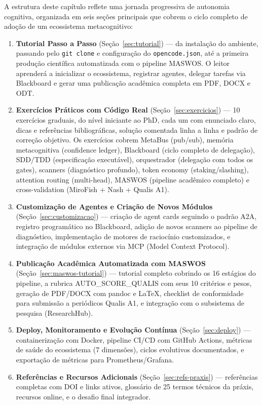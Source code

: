 A estrutura deste capítulo reflete uma jornada progressiva de autonomia cognitiva, organizada em seis seções principais que cobrem o ciclo completo de adoção de um ecossistema metacognitivo:

\begin{enumerate}[leftmargin=*, label=(\arabic*)]
  \item \textbf{Tutorial Passo a Passo} (Seção~\ref{sec:tutorial}) — da instalação do ambiente, passando pelo \texttt{git clone} e configuração do \texttt{opencode.json}, até a primeira produção científica automatizada com o pipeline MASWOS. O leitor aprenderá a inicializar o ecossistema, registrar agentes, delegar tarefas via Blackboard e gerar uma publicação acadêmica completa em PDF, DOCX e ODT.
  \item \textbf{Exercícios Práticos com Código Real} (Seção~\ref{sec:exercicios}) — 10 exercícios graduais, do nível iniciante ao PhD, cada um com enunciado claro, dicas e referências bibliográficas, solução comentada linha a linha e padrão de correção objetivo. Os exercícios cobrem MetaBus (pub/sub), memória metacognitiva (confidence ledger), Blackboard (ciclo completo de delegação), SDD/TDD (especificação executável), orquestrador (delegação com todos os gates), scanners (diagnóstico profundo), token economy (staking/slashing), attention routing (multi-head), MASWOS (pipeline acadêmico completo) e cross-validation (MiroFish + Nash + Qualis A1).
  \item \textbf{Customização de Agentes e Criação de Novos Módulos} (Seção~\ref{sec:customizacao}) — criação de agent cards seguindo o padrão A2A, registro programático no Blackboard, adição de novos scanners ao pipeline de diagnóstico, implementação de motores de raciocínio customizados, e integração de módulos externos via MCP (Model Context Protocol).
  \item \textbf{Publicação Acadêmica Automatizada com MASWOS} (Seção~\ref{sec:maswos-tutorial}) — tutorial completo cobrindo os 16 estágios do pipeline, a rubrica AUTO\_SCORE\_QUALIS com seus 10 critérios e pesos, geração de PDF/DOCX com pandoc e LaTeX, checklist de conformidade para submissão a periódicos Qualis A1, e integração com o subsistema de pesquisa (ResearchHub).
  \item \textbf{Deploy, Monitoramento e Evolução Contínua} (Seção~\ref{sec:deploy}) — containerização com Docker, pipeline CI/CD com GitHub Actions, métricas de saúde do ecossistema (7 dimensões), ciclos evolutivos documentados, e exportação de métricas para Prometheus/Grafana.
  \item \textbf{Referências e Recursos Adicionais} (Seção~\ref{sec:refs-praxis}) — referências completas com DOI e links ativos, glossário de 25 termos técnicos da práxis, recursos online, e o desafio final integrador.
\end{enumerate}

